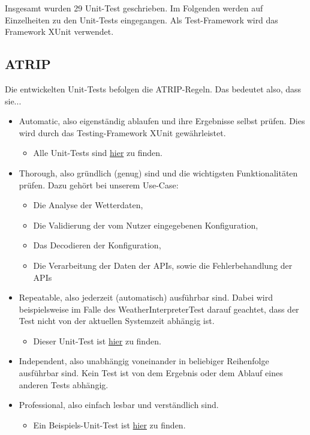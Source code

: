 Insgesamt wurden 29 Unit-Test geschrieben. Im Folgenden werden auf Einzelheiten zu den Unit-Tests eingegangen. Als Test-Framework wird das Framework XUnit verwendet.
\subsection{ATRIP}
Die entwickelten Unit-Tests befolgen die ATRIP-Regeln.
Das bedeutet also, dass sie...
\begin{itemize}
\item Automatic, also eigenständig ablaufen und ihre Ergebnisse selbst prüfen. Dies wird durch das Testing-Framework XUnit gewährleistet.
\begin{itemize}
\item Alle Unit-Tests sind \href{https://github.com/Bronzila/WeatherWallpaper/tree/master/WeatherWallpaperTest}{\color{blue}hier} zu finden.
\end{itemize}
\item Thorough, also gründlich (genug) sind und die wichtigsten Funktionalitäten prüfen. Dazu gehört bei unserem Use-Case:
\begin{itemize}
\item Die Analyse der Wetterdaten,
\item Die Validierung der vom Nutzer eingegebenen Konfiguration,
\item Das Decodieren der Konfiguration,
\item Die Verarbeitung der Daten der APIs, sowie die Fehlerbehandlung der APIs
\end{itemize}
\item Repeatable, also jederzeit (automatisch) ausführbar sind. Dabei wird beispielsweise im Falle des WeatherInterpreterTest darauf geachtet, dass der Test nicht von der aktuellen Systemzeit abhängig ist.
\begin{itemize}
\item Dieser Unit-Test ist \href{https://github.com/Bronzila/WeatherWallpaper/blob/master/WeatherWallpaperTest/WeatherInterpreterTest.cs}{\color{blue}hier} zu finden.
\end{itemize}
\item Independent, also unabhängig voneinander in beliebiger Reihenfolge ausführbar sind. Kein Test ist von dem Ergebnis oder dem Ablauf eines anderen Tests abhängig.
\item Professional, also einfach lesbar und verständlich sind.
\begin{itemize}
\item Ein Beispiels-Unit-Test ist \href{https://github.com/Bronzila/WeatherWallpaper/blob/master/WeatherWallpaperTest/ImageHandlerTest.cs}{\color{blue}hier} zu finden.
\end{itemize}
\end{itemize}
